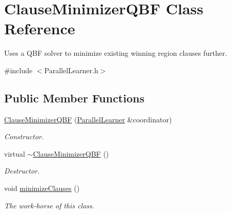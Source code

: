 \hypertarget{classClauseMinimizerQBF}{\section{Clause\-Minimizer\-Q\-B\-F Class Reference}
\label{classClauseMinimizerQBF}
}


Uses a Q\-B\-F solver to minimize existing winning region clauses further.  




{\ttfamily \#include $<$Parallel\-Learner.\-h$>$}

\subsection*{Public Member Functions}
\begin{DoxyCompactItemize}
\item 
\hyperlink{classClauseMinimizerQBF_a546fc0244b0e271cc79f86e8f45e7631}{Clause\-Minimizer\-Q\-B\-F} (\hyperlink{classParallelLearner}{Parallel\-Learner} \&coordinator)
\begin{DoxyCompactList}\small\item\em Constructor. \end{DoxyCompactList}\item 
virtual \hyperlink{classClauseMinimizerQBF_af3d84d76f410d1c0184e29990262d4d3}{$\sim$\-Clause\-Minimizer\-Q\-B\-F} ()
\begin{DoxyCompactList}\small\item\em Destructor. \end{DoxyCompactList}\item 
void \hyperlink{classClauseMinimizerQBF_a5f6aca824bfe92db2355483d40db140f}{minimize\-Clauses} ()
\begin{DoxyCompactList}\small\item\em The work-\/horse of this class. \end{DoxyCompactList}\end{DoxyCompactItemize}
